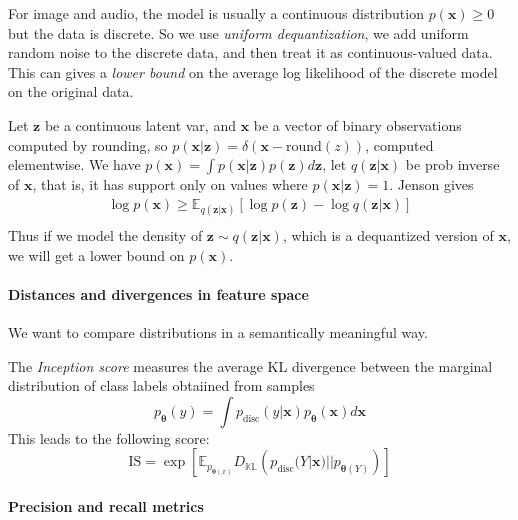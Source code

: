 \documentclass[../main.tex]{subfiles}
\begin{document}
\begin{note}
    For image and audio, the model is usually a continuous distribution $p(\boldsymbol{x}) \ge  0$ but the data is discrete. So we use \emph{uniform dequantization}, we add uniform random noise to the discrete data, and then treat it as continuous-valued data.
    This can gives a \emph{lower bound} on the average log likelihood of the discrete model on the original data.
    
    Let $\boldsymbol{z}$ be a continuous latent var, and $\boldsymbol{x}$ be a vector of binary observations computed by rounding, so $p(\boldsymbol{x} | \boldsymbol{z}) = \delta(\boldsymbol{x} - \text{round}(z))$, computed elementwise.
    We have $p(\boldsymbol{x}) = \int p(\boldsymbol{x} | \boldsymbol{z}) p(\boldsymbol{z})d\boldsymbol{z}$, let $q(\boldsymbol{z} | \boldsymbol{x})$ be prob inverse of $\boldsymbol{x}$, that is, it has support only on values where $p(\boldsymbol{x} | \boldsymbol{z}) = 1$. Jenson gives
    \[
    \begin{aligned}
    \log p(\boldsymbol{x}) \ge  \mathbb{E}_{q(\boldsymbol{z} | \boldsymbol{x})} \left[ \log p(\boldsymbol{z}) - \log q(\boldsymbol{z} | \boldsymbol{x}) \right]  \\
    \end{aligned}
    \]
    Thus if we model the density of $\boldsymbol{z} \sim  q(\boldsymbol{z} | \boldsymbol{x})$, which is a dequantized version of $\boldsymbol{x}$, we will get a lower bound on $p(\boldsymbol{x})$.

\end{note} 


\paragraph{Distances and divergences in feature space}

We want to compare distributions in a semantically meaningful way.

The \emph{Inception score} measures the average KL divergence between the marginal distribution of class labels obtaiined from samples 
\[
p_{\boldsymbol{\theta}}(y) = \int p_{\text{disc}} (y | \boldsymbol{x}) p_{\boldsymbol{\theta}}(\boldsymbol{x}) d\boldsymbol{x}
\]
This leads to the following score:
\[
\text{IS} = \exp \left[ \mathbb{E}_{p_{\boldsymbol{\theta}(x)}} D_{\mathbb{KL}} \left( p_{\text{disc}}(Y|\boldsymbol{x}) || p_{\boldsymbol{\theta}(Y)} \right)  \right] 
\]

\paragraph{Precision and recall metrics}
\end{document}
